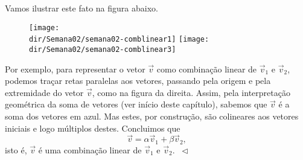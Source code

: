 \documentclass[../livro.tex]{subfiles}  %
\providecommand{\dir}{..}
\begin{document}
\begin{example}
Vamos ilustrar este fato na figura abaixo.
\begin{figure}[h!]
\begin{center}
\texttt{[image: \\dir/Semana02/semana02-comblinear1]}
\texttt{[image: \\dir/Semana02/semana02-comblinear3]}
\end{center}
\end{figure}
Por exemplo, para representar o vetor $\vec{v}$ como combinação linear de $\vec{v}_1$ e $\vec{v}_2$, podemos traçar retas paralelas aos vetores, passando pela origem e pela extremidade do vetor $\vec{v}$, como na figura da direita. Assim, pela interpretação geométrica da soma de vetores (ver início deste capítulo), sabemos que $\vec{v}$ é a soma dos vetores em azul. Mas estes, por construção, são colineares aos vetores iniciais e logo múltiplos destes. Concluimos que
\[
\vec{v} = \alpha \vec{v}_1 + \beta \vec{v}_2,
\] isto é, $\vec{v}$ é uma combinação linear de $\vec{v}_1$ e $\vec{v}_2$. $\ \lhd$
\end{example}
\end{document}
